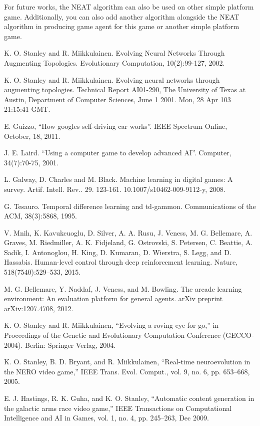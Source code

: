\documentclass[journal]{IEEEtran}
\begin{document}
For future works, the NEAT algorithm can also be used on other simple platform game. Additionally, you can also add another algorithm alongside the NEAT algorithm in producing game agent for this game or another simple platform game.

\begin{thebibliography}{99}

 K. O. Stanley and R. Miikkulainen. Evolving Neural Networks Through Augmenting Topologies. Evolutionary Computation, 10(2):99-127, 2002.

 K. O. Stanley and R. Miikkulainen. Evolving neural networks through augmenting topologies. Technical Report AI01-290, The University of Texas at Austin, Department of Computer Sciences, June 1 2001. Mon, 28 Apr 103 21:15:41 GMT.

 E. Guizzo, “How googles self-driving car works”. IEEE Spectrum Online, October, 18, 2011.

 J. E. Laird. “Using a computer game to develop advanced AI”. Computer, 34(7):70-75, 2001.

 L. Galway, D. Charles and M. Black. Machine learning in digital games: A survey. Artif. Intell. Rev.. 29. 123-161. 10.1007/s10462-009-9112-y, 2008.

 G. Tesauro. Temporal difference learning and td-gammon. Communications
of the ACM, 38(3):5868, 1995.

 V. Mnih, K. Kavukcuoglu, D. Silver, A. A. Rusu, J. Veness, M. G. Bellemare, A. Graves, M. Riedmiller, A. K. Fidjeland, G. Ostrovski, S. Petersen, C. Beattie, A. Sadik, I. Antonoglou, H. King, D. Kumaran, D. Wierstra, S. Legg, and D. Hassabis. Human-level control through deep reinforcement learning. Nature, 518(7540):529–533, 2015.

 M. G. Bellemare, Y. Naddaf, J. Veness, and M. Bowling. The arcade learning environment: An evaluation platform for general agents. arXiv preprint arXiv:1207.4708, 2012.

 K. O. Stanley and R. Miikkulainen, “Evolving a roving eye for go,” in Proceedings of the Genetic and Evolutionary Computation Conference (GECCO-2004). Berlin: Springer Verlag, 2004.

 K. O. Stanley, B. D. Bryant, and R. Miikkulainen, “Real-time neuroevolution in the NERO video game,” IEEE Trans. Evol. Comput., vol. 9, no. 6, pp. 653–668, 2005.

 E. J. Hastings, R. K. Guha, and K. O. Stanley, “Automatic content generation in the galactic arms race video game,” IEEE Transactions on Computational Intelligence and AI in Games, vol. 1, no. 4, pp. 245–263, Dec 2009.


\end{thebibliography}
\end{document}
